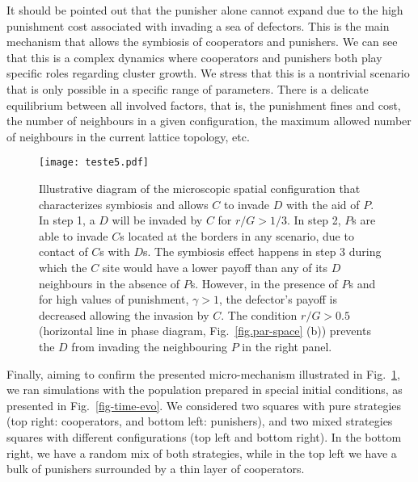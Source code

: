 \documentclass[5p]{elsarticle}
\begin{document}
It should be pointed out that the punisher alone cannot expand due to the high punishment cost associated with invading a sea of defectors.
%
This is the main mechanism that allows the symbiosis of cooperators and punishers. We can see that this is a complex dynamics where cooperators and punishers both play specific roles regarding cluster growth. 
We stress that this is a nontrivial scenario that is only possible in a specific range of parameters.
%
There is a delicate equilibrium between all involved factors, that is, the punishment fines and cost, the number of neighbours in a given configuration, the maximum allowed number of neighbours in the current lattice topology, etc.

\begin{figure}[t]
\begin{center}
    \texttt{[image: teste5.pdf]}
\caption{ Illustrative diagram of the microscopic spatial configuration that characterizes symbiosis and allows $C$ to invade $D$ with the aid of $P$. In step 1, a $D$ will be invaded by $C$ for  $r/G > 1/3$. In step 2, $P$s are able to invade $C$s located at the borders in any scenario, due to contact of $C$s with $D$s. The symbiosis effect happens in step 3 during which the $C$ site would have a lower payoff than any of its $D$ neighbours in the absence of $P$s. However, in the presence of $P$s and for high values of punishment, $\gamma > 1$,  the defector's payoff is decreased allowing the invasion by $C$. The condition $r/G > 0.5$ (horizontal line in phase diagram, Fig.~\ref{fig.par-space} (b)) prevents the $D$ from invading the neighbouring $P$ in the right panel.}
\label{desenho}
\end{center}
\end{figure}

Finally, aiming to confirm the presented micro-{mech\-a\-nism} illustrated in Fig.~\ref{desenho}, we ran simulations with the population prepared in special initial conditions, as presented in Fig.~\ref{fig-time-evo}. 
%
We considered two squares with pure strategies (top right: cooperators, and bottom left: punishers), and two mixed strategies squares with different configurations (top left and bottom right). In the bottom right, we have a random mix of both strategies, while in the top left we have a bulk of punishers surrounded by a thin layer of cooperators. 
\end{document}
